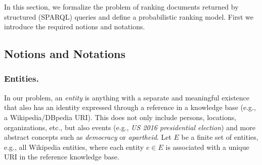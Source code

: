 
In this section, we formalize the problem of ranking documents returned by
structured (SPARQL) queries and define a probabilistic ranking model.
First we introduce the required notions and notations.

\subsection{Notions and Notations}

\subsubsection{Entities.}
In our problem, an {\em entity} is anything with a separate and meaningful existence
that also has an identity expressed through a reference in a knowledge base (e.g., a Wikipedia/DBpedia URI).
This does not only include persons, locations, organizations, etc., but also
events (e.g., {\em US 2016 presidential election})
and more abstract concepts such as {\em democracy} or {\em apartheid}.
Let $E$ be a finite set of entities, e.g., all Wikipedia entities,
where each entity $e \in E$ is associated with a unique URI in the reference knowledge base.

